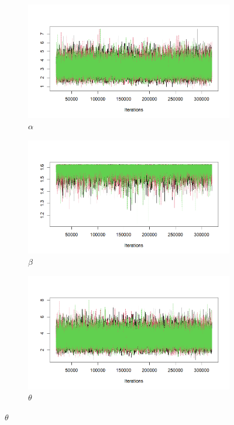 \documentclass{Class/julia}
\begin{document}
\begin{figure}[!ht]
    \centering
    \begin{subfigure}{0.45\textwidth}
        \centering
        \includegraphics[width=\textwidth]{rytgaard1990/trace_after_thinning_alpha.png}
        \caption{\( \alpha \)}
    \end{subfigure}
    \hfill
    \begin{subfigure}{0.45\textwidth}
        \centering
        \includegraphics[width=\textwidth]{rytgaard1990/trace_after_thinning_beta.png}
        \caption{\( \beta \)}
    \end{subfigure}

    \vspace{1em}

    \begin{subfigure}{0.45\textwidth}
        \centering
        \includegraphics[width=\textwidth]{rytgaard1990/trace_after_thinning_theta.png}
        \caption{\( \theta \)}
    \end{subfigure}


\end{figure}
\end{document}
